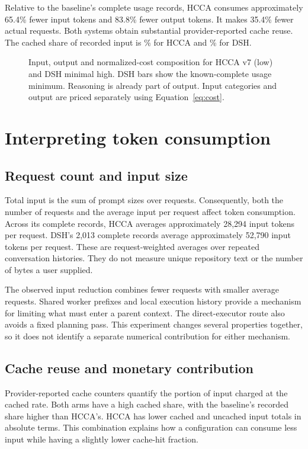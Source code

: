 \documentclass[10pt,a4paper]{article}
\begin{document}
Relative to the baseline's complete usage records, HCCA consumes approximately
65.4\% fewer input tokens and 83.8\% fewer output tokens. It makes 35.4\% fewer
actual requests. Both systems obtain substantial provider-reported cache reuse.
The cached share of recorded input is \HCachePct{}\% for HCCA and
\BCachePct{}\% for DSH.

\begin{figure}[ht]
\centering

\caption{Input, output and normalized-cost composition for HCCA v7 (low)
and DSH minimal high. DSH bars show the
known-complete usage minimum. Reasoning is already part of output. Input
categories and output are priced separately using Equation~\ref{eq:cost}.}
\label{fig:usage}
\end{figure}

\section{Interpreting token consumption}

\subsection{Request count and input size}

Total input is the sum of prompt sizes over requests. Consequently, both the
number of requests and the average input per request affect token consumption.
Across its complete records, HCCA averages approximately 28,294 input tokens
per request. DSH's 2,013 complete records average approximately 52,790 input
tokens per request. These are request-weighted averages over repeated
conversation histories. They do not measure unique repository text or the
number of bytes a user supplied.

The observed input reduction combines fewer requests with smaller average
requests. Shared worker prefixes and local execution history provide a
mechanism for limiting what must enter a parent context. The direct-executor
route also avoids a fixed planning pass. This experiment changes several
properties together, so it does not identify a separate numerical contribution
for either mechanism.

\subsection{Cache reuse and monetary contribution}

Provider-reported cache counters quantify the portion of input charged at the
cached rate. Both arms have a high cached share, with the baseline's recorded
share higher than HCCA's. HCCA has lower cached and uncached input totals in
absolute terms. This combination explains how a configuration can consume less
input while having a slightly lower cache-hit fraction.
\end{document}

